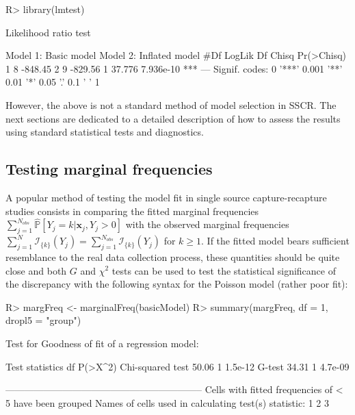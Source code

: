 \documentclass[
]{jss}
\newcommand{\1}{\mathcal{I}} \newcommand{\bZero}{\boldsymbol{0}}
\begin{document}
\begin{CodeChunk}
\begin{CodeInput}
R> library(lmtest)
\end{CodeInput}
\end{CodeChunk}

\begin{CodeChunk}
\begin{CodeOutput}
Likelihood ratio test

Model 1: Basic model
Model 2: Inflated model
  #Df  LogLik Df  Chisq Pr(>Chisq)    
1   8 -848.45                         
2   9 -829.56  1 37.776  7.936e-10 ***
---
Signif. codes:  0 '***' 0.001 '**' 0.01 '*' 0.05 '.' 0.1 ' ' 1
\end{CodeOutput}
\end{CodeChunk}

However, the above is not a standard method of model selection in SSCR.
The next sections are dedicated to a detailed description of how to
assess the results using standard statistical tests and diagnostics.

\subsection{Testing marginal
frequencies}\label{testing-marginal-frequencies}

A popular method of testing the model fit in single source
capture-recapture studies consists in comparing the fitted marginal
frequencies
\(\displaystyle\sum_{j=1}^{N_{obs}}\hat{\mathbb{P}}\left[Y_{j}=k|\boldsymbol{x}_{j}, Y_{j} > 0\right]\)
with the observed marginal frequencies
\(\displaystyle\sum_{j=1}^{N}\mathcal{I}_{\{k\}}(Y_{j})=\sum_{j=1}^{N_{obs}}\mathcal{I}_{\{k\}}(Y_{j})\)
for \(k\geq1\). If the fitted model bears sufficient resemblance to the
real data collection process, these quantities should be quite close and
both \(G\) and \(\chi^{2}\) tests can be used to test the statistical
significance of the discrepancy with the following 
syntax for the Poisson model (rather poor fit):

\begin{CodeChunk}
\begin{CodeInput}
R> margFreq <- marginalFreq(basicModel)
R> summary(margFreq, df = 1, dropl5 = "group")
\end{CodeInput}
\begin{CodeOutput}
Test for Goodness of fit of a regression model:

                 Test statistics df P(>X^2)
Chi-squared test           50.06  1 1.5e-12
G-test                     34.31  1 4.7e-09

-------------------------------------------------------------- 
Cells with fitted frequencies of < 5 have been grouped 
Names of cells used in calculating test(s) statistic: 1 2 3  
\end{CodeOutput}
\end{CodeChunk}
\end{document}
